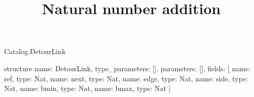 \begin{lexlean}{Catalog.DetourLink}
\title{Natural number addition}
\begin{semanticmodule}
structure{
  name: DetourLink,
  type_parameters: [],
  parameters: [],
  fields: [
    {name: ref, type: Nat},
    {name: next, type: Nat},
    {name: edge, type: Nat},
    {name: side, type: Nat},
    {name: bmin, type: Nat},
    {name: bmax, type: Nat}
  ]
}
\end{semanticmodule}
\end{lexlean}
